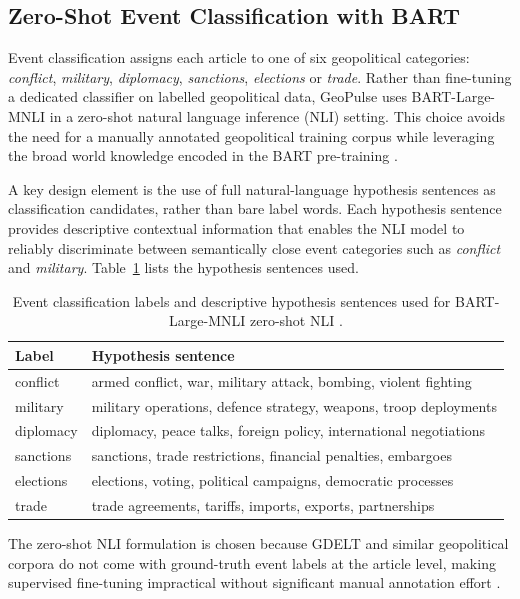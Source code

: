 \documentclass[12pt,a4paper]{report}
\begin{document}
\subsection{Zero-Shot Event Classification with BART}

Event classification assigns each article to one of six geopolitical
categories: \emph{conflict}, \emph{military}, \emph{diplomacy},
\emph{sanctions}, \emph{elections} or \emph{trade}. Rather than
fine-tuning a dedicated classifier on labelled geopolitical data,
GeoPulse uses BART-Large-MNLI \cite{lewis2020} in a zero-shot natural
language inference (NLI) setting. This choice avoids the need for a
manually annotated geopolitical training corpus while leveraging the
broad world knowledge encoded in the BART pre-training \cite{lewis2020}.

A key design element is the use of full natural-language hypothesis
sentences as classification candidates, rather than bare label words.
Each hypothesis sentence provides descriptive contextual information that
enables the NLI model to reliably discriminate between semantically close
event categories such as \emph{conflict} and \emph{military}.
Table~\ref{tab:hypothesis} lists the hypothesis sentences used.

\begin{table}[H]
\centering
\caption{Event classification labels and descriptive hypothesis sentences
  used for BART-Large-MNLI zero-shot NLI \cite{lewis2020}.}
\label{tab:hypothesis}
\begin{tabular}{ll}
\toprule
\textbf{Label} & \textbf{Hypothesis sentence} \\
\midrule
conflict  & armed conflict, war, military attack, bombing, violent fighting \\
military  & military operations, defence strategy, weapons, troop deployments \\
diplomacy & diplomacy, peace talks, foreign policy, international negotiations \\
sanctions & sanctions, trade restrictions, financial penalties, embargoes \\
elections & elections, voting, political campaigns, democratic processes \\
trade     & trade agreements, tariffs, imports, exports, partnerships \\
\bottomrule
\end{tabular}
\end{table}

The zero-shot NLI formulation is chosen because GDELT and similar
geopolitical corpora do not come with ground-truth event labels at the
article level, making supervised fine-tuning impractical without
significant manual annotation effort \cite{leetaru2013}.
\end{document}
